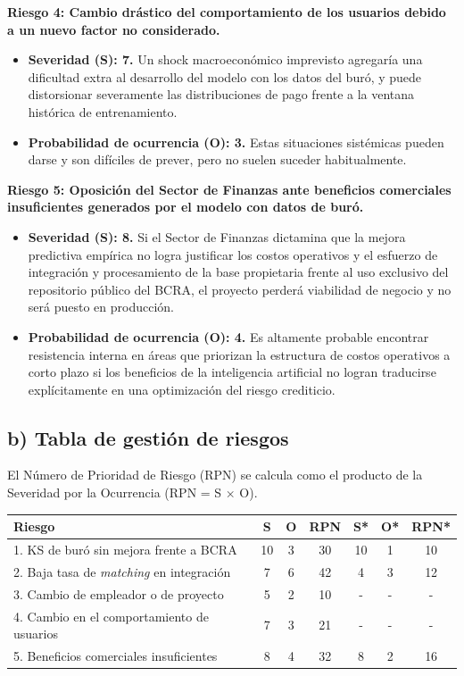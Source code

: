 \documentclass[
11pt, %
]{charter}
\begin{document}
\textbf{Riesgo 4: Cambio drástico del comportamiento de los usuarios debido a un nuevo factor no considerado.}
\begin{itemize}
    \item \textbf{Severidad (S): 7.} Un shock macroeconómico imprevisto agregaría una dificultad extra al desarrollo del modelo con los datos del buró, y puede distorsionar severamente las distribuciones de pago frente a la ventana histórica de entrenamiento.
    \item \textbf{Probabilidad de ocurrencia (O): 3.} Estas situaciones sistémicas pueden darse y son difíciles de prever, pero no suelen suceder habitualmente.
\end{itemize}

\textbf{Riesgo 5: Oposición del Sector de Finanzas ante beneficios comerciales insuficientes generados por el modelo con datos de buró.}
\begin{itemize}
    \item \textbf{Severidad (S): 8.} Si el Sector de Finanzas dictamina que la mejora predictiva empírica no logra justificar los costos operativos y el esfuerzo de integración y procesamiento de la base propietaria frente al uso exclusivo del repositorio público del BCRA, el proyecto perderá viabilidad de negocio y no será puesto en producción.
    \item \textbf{Probabilidad de ocurrencia (O): 4.} Es altamente probable encontrar resistencia interna en áreas que priorizan la estructura de costos operativos a corto plazo si los beneficios de la inteligencia artificial no logran traducirse explícitamente en una optimización del riesgo crediticio.
\end{itemize}

\subsection*{b) Tabla de gestión de riesgos}

El Número de Prioridad de Riesgo (RPN) se calcula como el producto de la Severidad por la Ocurrencia (RPN = S $\times$ O).

\begin{table}[htpb]
\centering
\begin{tabularx}{\linewidth}{@{}|X|c|c|c|c|c|c|@{}}
\hline
\rowcolor[HTML]{C0C0C0} 
\textbf{Riesgo} & \textbf{S} & \textbf{O} & \textbf{RPN} & \textbf{S*} & \textbf{O*} & \textbf{RPN*} \\ \hline
1. KS de buró sin mejora frente a BCRA & 10 & 3 & 30 & 10 & 1 & 10 \\ \hline
2. Baja tasa de \textit{matching} en integración & 7 & 6 & 42 & 4 & 3 & 12 \\ \hline
3. Cambio de empleador o de proyecto & 5 & 2 & 10 & - & - & - \\ \hline
4. Cambio en el comportamiento de usuarios & 7 & 3 & 21 & - & - & - \\ \hline
5. Beneficios comerciales insuficientes & 8 & 4 & 32 & 8 & 2 & 16 \\ \hline
\end{tabularx}%
\end{table}
\end{document}
